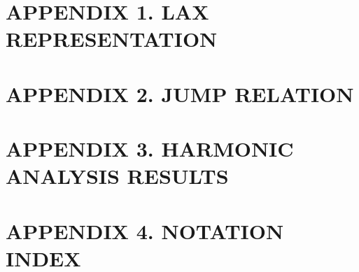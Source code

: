 \documentclass[../dissertation.tex]{subfiles}
\begin{document}
\section{APPENDIX 1. LAX REPRESENTATION}\label{app:Lax}

\newpage


% 




\section{APPENDIX 2. JUMP RELATION}\label{app:JumpRelation}

\newpage


\section{APPENDIX 3. HARMONIC ANALYSIS RESULTS}\label{app:HA}

\newpage

\section{APPENDIX 4. NOTATION INDEX}\label{app:Notation}

\end{document}

